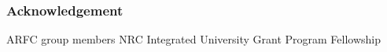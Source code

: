 \begin{frame}
  \frametitle{Acknowledgement}
    \Gls{ARFC} group members 
    \newline
    NRC Integrated University Grant Program Fellowship
\end{frame}
